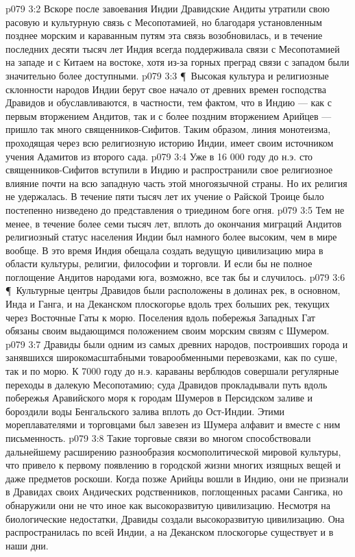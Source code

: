 \vs p079 3:2 Вскоре после завоевания Индии Дравидские Андиты утратили свою расовую и культурную связь с Месопотамией, но благодаря установленным позднее морским и караванным путям эта связь возобновилась, и в течение последних десяти тысяч лет Индия всегда поддерживала связи с Месопотамией на западе и с Китаем на востоке, хотя из\hyp{}за горных преград связи с западом были значительно более доступными.
\vs p079 3:3 \P\ Высокая культура и религиозные склонности народов Индии берут свое начало от древних времен господства Дравидов и обуславливаются, в частности, тем фактом, что в Индию --- как с первым вторжением Андитов, так и с более поздним вторжением Арийцев --- пришло так много священников\hyp{}Сифитов. Таким образом, линия монотеизма, проходящая через всю религиозную историю Индии, имеет своим источником учения Адамитов из второго сада.
\vs p079 3:4 Уже в 16 000 году до н.э. сто священников\hyp{}Сифитов вступили в Индию и распространили свое религиозное влияние почти на всю западную часть этой многоязычной страны. Но их религия не удержалась. В течение пяти тысяч лет их учение о Райской Троице было постепенно низведено до представления о триедином боге огня.
\vs p079 3:5 Тем не менее, в течение более семи тысяч лет, вплоть до окончания миграций Андитов религиозный статус населения Индии был намного более высоким, чем в мире вообще. В это время Индия обещала создать ведущую цивилизацию мира в области культуры, религии, философии и торговли. И если бы не полное поглощение Андитов народами юга, возможно, все так бы и случилось.
\vs p079 3:6 \P\ Культурные центры Дравидов были расположены в долинах рек, в основном, Инда и Ганга, и на Деканском плоскогорье вдоль трех больших рек, текущих через Восточные Гаты к морю. Поселения вдоль побережья Западных Гат обязаны своим выдающимся положением своим морским связям с Шумером.
\vs p079 3:7 Дравиды были одним из самых древних народов, построивших города и занявшихся широкомасштабными товарообменными перевозками, как по суше, так и по морю. К 7000 году до н.э. караваны верблюдов совершали регулярные переходы в далекую Месопотамию; суда Дравидов прокладывали путь вдоль побережья Аравийского моря к городам Шумеров в Персидском заливе и бороздили воды Бенгальского залива вплоть до Ост\hyp{}Индии. Этими мореплавателями и торговцами был завезен из Шумера алфавит и вместе с ним письменность.
\vs p079 3:8 Такие торговые связи во многом способствовали дальнейшему расширению разнообразия космополитической мировой культуры, что привело к первому появлению в городской жизни многих изящных вещей и даже предметов роскоши. Когда позже Арийцы вошли в Индию, они не признали в Дравидах своих Андических родственников, поглощенных расами Сангика, но обнаружили они не что иное как высокоразвитую цивилизацию. Несмотря на биологические недостатки, Дравиды создали высокоразвитую цивилизацию. Она распространилась по всей Индии, а на Деканском плоскогорье существует и в наши дни.
